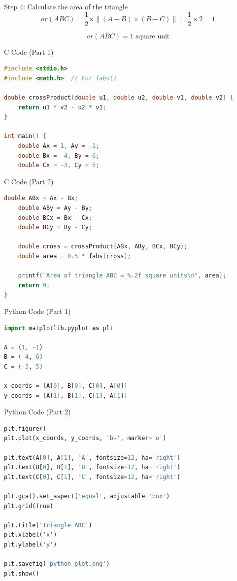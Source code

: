 \documentclass{beamer}
\begin{document}
\begin{frame}{Step 4: Calculate the area of the triangle}
\[
ar(ABC) = \frac{1}{2} \times \| (A-B) \times (B-C) \| = \frac{1}{2} \times 2 = 1
\]

\[
\boxed{ar(ABC) = 1 \text{ square unit}}
\]
\end{frame}

\begin{frame}[fragile]{C Code (Part 1)}
\begin{lstlisting}[language=C]
#include <stdio.h>
#include <math.h>  // For fabs()

double crossProduct(double u1, double u2, double v1, double v2) {
    return u1 * v2 - u2 * v1;
}

int main() {
    double Ax = 1, Ay = -1;
    double Bx = -4, By = 6;
    double Cx = -3, Cy = 5;
\end{lstlisting}
\end{frame}

\begin{frame}[fragile]{C Code (Part 2)}
\begin{lstlisting}[language=C]
    double ABx = Ax - Bx;
    double ABy = Ay - By;
    double BCx = Bx - Cx;
    double BCy = By - Cy;

    double cross = crossProduct(ABx, ABy, BCx, BCy);
    double area = 0.5 * fabs(cross);

    printf("Area of triangle ABC = %.2f square units\n", area);
    return 0;
}
\end{lstlisting}
\end{frame}

\begin{frame}[fragile]{Python Code (Part 1)}
\begin{lstlisting}[language=Python]
import matplotlib.pyplot as plt

A = (1, -1)
B = (-4, 6)
C = (-3, 5)

x_coords = [A[0], B[0], C[0], A[0]]
y_coords = [A[1], B[1], C[1], A[1]]
\end{lstlisting}
\end{frame}

\begin{frame}[fragile]{Python Code (Part 2)}
\begin{lstlisting}[language=Python]
plt.figure()
plt.plot(x_coords, y_coords, 'b-', marker='o')

plt.text(A[0], A[1], 'A', fontsize=12, ha='right')
plt.text(B[0], B[1], 'B', fontsize=12, ha='right')
plt.text(C[0], C[1], 'C', fontsize=12, ha='right')

plt.gca().set_aspect('equal', adjustable='box')
plt.grid(True)

plt.title('Triangle ABC')
plt.xlabel('x')
plt.ylabel('y')

plt.savefig('python_plot.png')
plt.show()
\end{lstlisting}
\end{frame}
\end{document}
